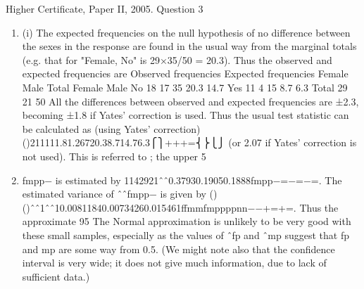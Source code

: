 \documentclass[a4paper,12pt]{article}
\begin{document}
Higher Certificate, Paper II, 2005. Question 3
\begin{enumerate}
\item (i) The expected frequencies on the null hypothesis of no difference between the sexes in the response are found in the usual way from the marginal totals (e.g. that for "Female, No" is 29×35/50 = 20.3). Thus the observed and expected frequencies are
Observed frequencies
Expected frequencies
Female
Male
Total
Female
Male
No
18
17
35
20.3
14.7
Yes
11
4
15
8.7
6.3
Total
29
21
50
All the differences between observed and expected frequencies are ±2.3, becoming ±1.8 if Yates' correction is used. Thus the usual test statistic can be calculated as (using Yates' correction)
()211111.81.26720.38.714.76.3⎧⎫+++=⎨⎬⎩⎭
(or 2.07 if Yates' correction is not used). This is referred to ; the upper 5%
\item  fmpp− is estimated by 1142921ˆˆ0.37930.19050.1888fmpp−=−=−=. The estimated variance of ˆˆfmpp− is given by
()()ˆˆ1ˆˆ10.00811840.00734260.015461ffmmfmppppnn−−+=+=.
Thus the approximate 95%
The Normal approximation is unlikely to be very good with these small samples, especially as the values of ˆfp and ˆmp suggest that fp and mp are some way from 0.5.
(We might note also that the confidence interval is very wide; it does not give much information, due to lack of sufficient data.)
\end{enumerate}
\end{document}
